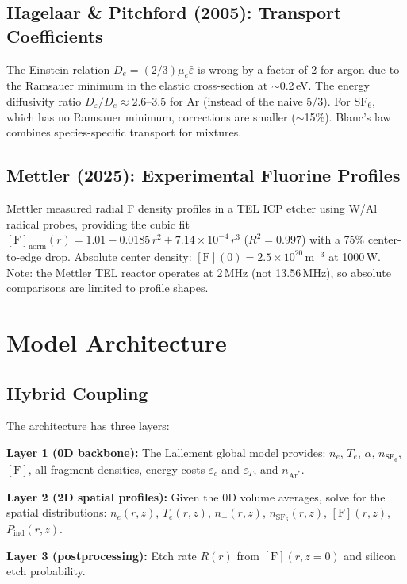 \documentclass[11pt,a4paper]{article}
\renewcommand{\ne}{n_e}
\newcommand{\Te}{T_e}
\newcommand{\SFsix}{\mathrm{SF}_6}
\newcommand{\Ar}{\mathrm{Ar}}
\begin{document}
\subsection{Hagelaar \& Pitchford (2005): Transport Coefficients}
The Einstein relation $D_e = (2/3)\mu_e\bar{\varepsilon}$ is wrong by a factor of 2 for argon due to the Ramsauer minimum in the elastic cross-section at $\sim$0.2\,eV.  The energy diffusivity ratio $D_\varepsilon/D_e \approx 2.6$--$3.5$ for Ar (instead of the naive 5/3).  For SF$_6$, which has no Ramsauer minimum, corrections are smaller ($\sim$15\%).  Blanc's law combines species-specific transport for mixtures.

\subsection{Mettler (2025): Experimental Fluorine Profiles}
Mettler measured radial F density profiles in a TEL ICP etcher using W/Al radical probes, providing the cubic fit $[\mathrm{F}]_{\mathrm{norm}}(r) = 1.01 - 0.0185\,r^2 + 7.14\times10^{-4}\,r^3$ ($R^2 = 0.997$) with a 75\% center-to-edge drop.  Absolute center density: $[\mathrm{F}](0) = 2.5\times10^{20}$\,m$^{-3}$ at 1000\,W.  Note: the Mettler TEL reactor operates at 2\,MHz (not 13.56\,MHz), so absolute comparisons are limited to profile shapes.

\section{Model Architecture}
\label{sec:arch}

\subsection{Hybrid Coupling}

The architecture has three layers:

\textbf{Layer 1 (0D backbone):} The Lallement global model provides: $\ne$, $\Te$, $\alpha$, $n_{\SFsix}$, $[\mathrm{F}]$, all fragment densities, energy costs $\varepsilon_c$ and $\varepsilon_T$, and $n_{\Ar^*}$.

\textbf{Layer 2 (2D spatial profiles):} Given the 0D volume averages, solve for the spatial distributions: $\ne(r,z)$, $\Te(r,z)$, $n_-(r,z)$, $n_{\SFsix}(r,z)$, $[\mathrm{F}](r,z)$, $P_{\mathrm{ind}}(r,z)$.

\textbf{Layer 3 (postprocessing):} Etch rate $R(r)$ from $[\mathrm{F}](r, z=0)$ and silicon etch probability.
\end{document}
